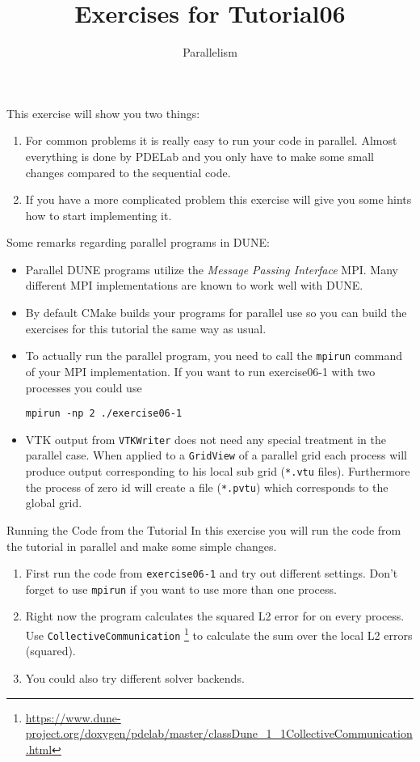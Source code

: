 \documentclass[12pt,a4paper]{article}
\title{\textbf{Exercises for Tutorial06}}
\subtitle{Parallelism}
\begin{document}
\exerciseheader

This exercise will show you two things:
\begin{enumerate}
\item For common problems it is really easy to run your code in
  parallel. Almost everything is done by PDELab and you only have to make
  some small changes compared to the sequential code.
\item If you have a more complicated problem this exercise will give
  you some hints how to start implementing it.
\end{enumerate}

Some remarks regarding parallel programs in DUNE:
\begin{itemize}
\item Parallel DUNE programs utilize the \emph{Message Passing
    Interface} MPI. Many different MPI implementations are known to
  work well with DUNE.
\item By default CMake builds your programs for parallel use so you
  can build the exercises for this tutorial the same way as usual.
\item To actually run the parallel program, you need to call the
  \lstinline{mpirun} command of your MPI implementation. If you want
  to run exercise06-1 with two processes you could use
  \begin{lstlisting}
mpirun -np 2 ./exercise06-1
  \end{lstlisting}
\item VTK output from \lstinline{VTKWriter} does not need any special
  treatment in the parallel case. When applied to a
  \lstinline{GridView} of a parallel grid each process will produce
  output corresponding to his local sub grid (\lstinline{*.vtu}
  files).  Furthermore the process of zero id will create a file
  (\lstinline{*.pvtu}) which corresponds to the global grid.
\end{itemize}

\begin{Exercise}{Running the Code from the Tutorial}
  In this exercise you will run the code from the tutorial in parallel
  and make some simple changes.
  \begin{enumerate}
  \item First run the code from \lstinline{exercise06-1} and try out
    different settings. Don't forget to use \lstinline{mpirun} if you
    want to use more than one process.
  \item Right now the program calculates the squared L2 error for
    on every process. Use \lstinline{CollectiveCommunication}
    \footnote{\href{https://www.dune-project.org/doxygen/pdelab/master/classDune\_1\_1CollectiveCommunication.html}{https://www.dune-project.org/doxygen/pdelab/master/classDune\_1\_1CollectiveCommunication.html}}
    to calculate the sum over the local L2 errors (squared).
  \item You could also try different solver backends.
  \end{enumerate}
\end{Exercise}
\end{document}
